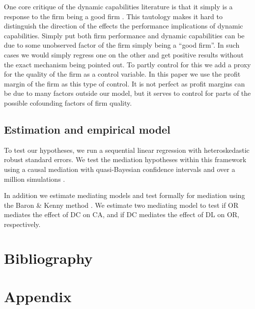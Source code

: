 \documentclass[review,fleqn]{elsarticle}\usepackage[]{graphicx}\usepackage[]{color}
\begin{document}
One core critique of the dynamic capabilities literature is that it simply is a response
to the firm being a good firm \citep{Arend2009}. This tautology makes it hard to
distinguish the direction of the effects the performance implications of dynamic
capabilities. Simply put both firm performance and dynamic capabilities can be due to some
unobserved factor of the firm simply being a “good firm”. In such cases we would simply
regress one on the other and get positive results without the exact mechanism being
pointed out. To partly control for this we add a proxy for the quality of the firm as a
control variable. In this paper we use the profit margin of the firm as this type of
control. It is not perfect as profit margins can be due to many factors outside our model,
but it serves to control for parts of the possible cofounding factors of firm quality.

\subsection{Estimation and empirical model}

To test our hypotheses, we run a sequential linear regression with heteroskedastic robust
standard errors. We test the mediation hypotheses within this framework using a causal
mediation \citep{Baron1986,MacKinnon2008} with quasi-Bayesian confidence intervals and
over a million simulations \citep{Imai2010}.

In addition we estimate mediating models and test formally for mediation using the Baron
\& Kenny method \citep{Baron1986,MacKinnon2008}. We estimate two mediating model to test
if OR mediates the effect of DC on CA, and if DC mediates the effect of DL on OR,
respectively.









\section{Bibliography}


\singlespacing




\section{Appendix}
\end{document}
